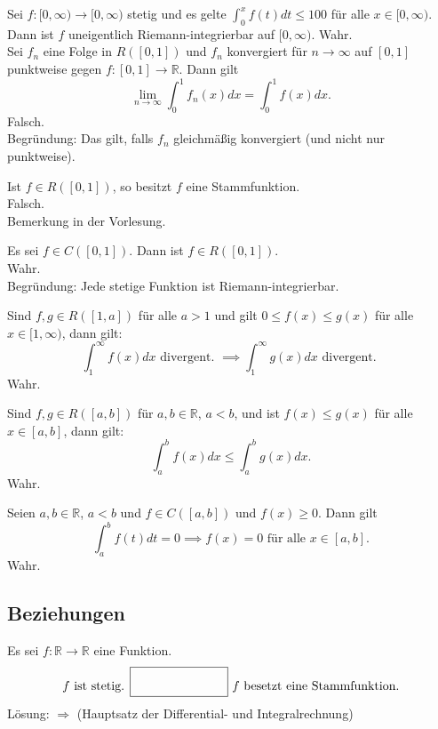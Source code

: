 Sei $f : [0, \infty)\to [0,\infty)$ stetig und es gelte $\int_{0}^{x} f(t)dt \leq 100$ für alle $x \in [0, \infty)$.
Dann ist $f$ uneigentlich Riemann-integrierbar auf $[0,\infty)$.
Wahr.\\

Sei $f_n$ eine Folge in $R([0,1])$ und $f_n$ konvergiert für $n \to \infty$ auf $[0,1]$ punktweise gegen $f: [0,1] \to \mathbb{R}$.
Dann gilt
\begin{displaymath}
  \lim_{n \to \infty} \int_{0}^{1} f_n(x)dx = \int_{0}^{1} f(x)dx.
\end{displaymath}
Falsch.\\
Begründung: Das gilt, falls $f_n$ gleichmäßig konvergiert (und nicht nur punktweise).

Ist $f \in R([0,1])$, so besitzt $f$ eine Stammfunktion.\\
Falsch.\\
Bemerkung in der Vorlesung.

Es sei $f \in C([0,1])$.
Dann ist $f \in R([0,1])$.\\
Wahr.\\
Begründung: Jede stetige Funktion ist Riemann-integrierbar.

Sind $f,g \in R([1,a])$ für alle $a > 1$ und gilt $0 \leq f(x) \leq g(x)$ für alle $x \in [1,\infty)$, dann gilt:
\begin{displaymath}
  \int_{1}^{\infty} f(x) dx \text{ divergent. } \implies \int_{1}^{\infty} g(x) dx \text{ divergent. }
\end{displaymath}
Wahr.

Sind $f,g \in R([a,b])$ für $a,b \in \mathbb{R}$, $a < b$, und ist $f(x) \leq g(x)$ für alle $x \in [a,b]$, dann gilt:
\begin{displaymath}
  \int_{a}^{b} f(x) dx \leq \int_{a}^{b} g(x) dx.
\end{displaymath}
Wahr.

Seien $a,b \in \mathbb{R}$, $a < b$ und $f \in C([a,b])$ und $f(x) \geq 0$.
Dann gilt
\begin{displaymath}
  \int_{a}^{b} f(t) dt = 0 \implies f(x) = 0 \text{ für alle } x \in [a,b].
\end{displaymath}
Wahr.

\subsection{Beziehungen}
Es sei $f: \mathbb{R} \to \mathbb{R}$ eine Funktion.
\begin{displaymath}
  f \text{ ist stetig. } \fbox{\rule{1in}{0pt}\rule[-0.5ex]{0pt}{4ex}} \text{ $f$ besetzt eine Stammfunktion.}
\end{displaymath}
Lösung: $\Rightarrow$ (Hauptsatz der Differential- und Integralrechnung)